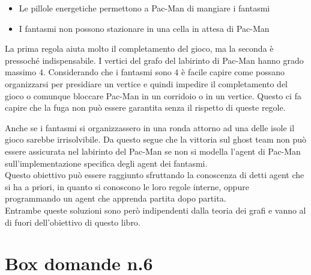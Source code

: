 \documentclass[8pt]{book}
\begin{document}
\begin{itemize}
\item
  Le pillole energetiche permettono a Pac-Man di mangiare i fantasmi
\item
  I fantasmi non possono stazionare in una cella in attesa di Pac-Man
\end{itemize}

La prima regola aiuta molto il completamento del gioco, ma la seconda è pressoché indispensabile. I vertici del grafo del labirinto di Pac-Man hanno grado massimo $4$. Considerando che i fantasmi sono $4$ è facile capire come possano organizzarsi per presidiare un vertice e quindi impedire il completamento del gioco o comunque bloccare Pac-Man in un corridoio o in un vertice. Questo ci fa capire che la fuga non può essere garantita senza il rispetto di queste regole.

Anche se i fantasmi si organizzassero in una ronda attorno ad una delle isole il gioco sarebbe irrisolvibile. Da questo segue che la vittoria sul ghost team non può essere assicurata nel labirinto del Pac-Man se non si modella l'agent di Pac-Man sull'implementazione specifica degli agent dei fantasmi.\\
Questo obiettivo può essere raggiunto sfruttando la conoscenza di detti agent che si ha a priori, in quanto si conoscono le loro regole interne, oppure programmando un agent che apprenda partita dopo partita.\\
Entrambe queste soluzioni sono però indipendenti dalla teoria dei grafi e vanno al di fuori dell'obiettivo di questo libro.

\newpage
\section*{Box domande n.6}
\end{document}
